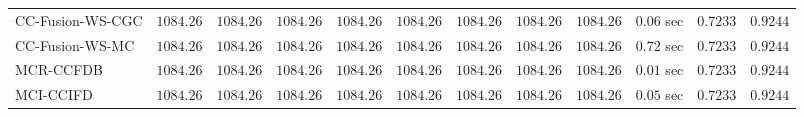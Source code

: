 \begin{table}[H]
\begin{tabular}{lrrrrrrrrrrr}
    CC-Fusion-WS-CGC & $      1084.26$ & $      1084.26$ & $      1084.26$ & $      1084.26$ & $      1084.26$ & $      1084.26$ & $      1084.26$ & $      1084.26$ & $         0.06$ sec    & $       0.7233$  & $       0.9244$ \\ 
     CC-Fusion-WS-MC & $      1084.26$ & $      1084.26$ & $      1084.26$ & $      1084.26$ & $      1084.26$ & $      1084.26$ & $      1084.26$ & $      1084.26$ & $         0.72$ sec    & $       0.7233$  & $       0.9244$ \\ 
\cmidrule{1-1} 
           MCR-CCFDB & $      1084.26$ & $      1084.26$ & $      1084.26$ & $      1084.26$ & $      1084.26$ & $      1084.26$ & $      1084.26$ & $      1084.26$ & $         0.01$ sec    & $       0.7233$  & $       0.9244$ \\ 
\cmidrule{1-1} 
           MCI-CCIFD & $      1084.26$ & $      1084.26$ & $      1084.26$ & $      1084.26$ & $      1084.26$ & $      1084.26$ & $      1084.26$ & $      1084.26$ & $         0.05$ sec    & $       0.7233$  & $       0.9244$ \\ 
\bottomrule
\end{tabular}
\end{table}

